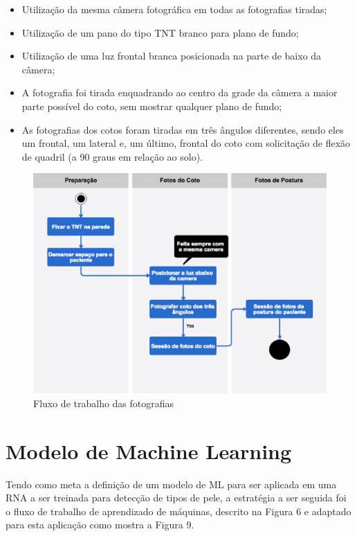     \begin{itemize}
        \item Utilização da mesma câmera fotográfica em todas as fotografias tiradas;
        \item Utilização de um pano do tipo TNT branco para plano de fundo;
        \item Utilização de uma luz frontal branca posicionada na parte de baixo da câmera;
        \item A fotografia foi tirada enquadrando ao centro da grade da câmera a maior parte possível do coto, sem mostrar qualquer plano de fundo;
        \item As fotografias dos cotos foram tiradas em três ângulos diferentes, sendo eles um frontal, um lateral e, um último, frontal do coto com solicitação de flexão de quadril (a 90 graus em relação ao solo).
    \end{itemize}

    \begin{figure}[ht]
        \centering
        \label{fig08}
            \includegraphics[keepaspectratio=true, scale=0.4]{editaveis/images/fotos_flow.eps}
        \caption{Fluxo de trabalho das fotografias}
    \end{figure}


\section{Modelo de Machine Learning}

    Tendo como meta a definição de um modelo de ML para ser aplicada em uma RNA a ser treinada para detecção de tipos de pele, a estratégia a ser seguida foi o fluxo de trabalho de aprendizado de máquinas, descrito na Figura 6 e adaptado para esta aplicação como mostra a Figura 9.

